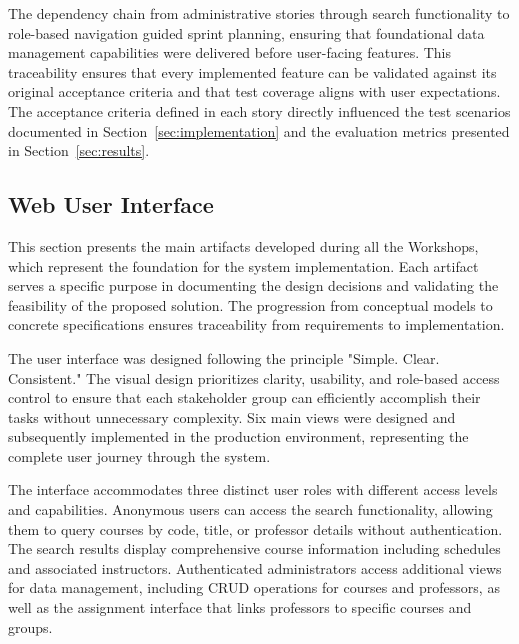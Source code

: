 \documentclass[12pt,a4paper]{article}
\begin{document}
The dependency chain from administrative stories through search functionality to role-based navigation guided sprint planning, ensuring that foundational data management capabilities were delivered before user-facing features. This traceability ensures that every implemented feature can be validated against its original acceptance criteria and that test coverage aligns with user expectations. The acceptance criteria defined in each story directly influenced the test scenarios documented in Section~\ref{sec:implementation} and the evaluation metrics presented in Section~\ref{sec:results}.

\subsection{Web User Interface}
This section presents the main artifacts developed during all the Workshops, which represent the foundation for the system implementation. Each artifact serves a specific purpose in documenting the design decisions and validating the feasibility of the proposed solution. The progression from conceptual models to concrete specifications ensures traceability from requirements to implementation.




The user interface was designed following the principle "Simple. Clear. Consistent." The visual design prioritizes clarity, usability, and role-based access control to ensure that each stakeholder group can efficiently accomplish their tasks without unnecessary complexity. Six main views were designed and subsequently implemented in the production environment, representing the complete user journey through the system.\newline

The interface accommodates three distinct user roles with different access levels and capabilities. Anonymous users can access the search functionality, allowing them to query courses by code, title, or professor details without authentication. The search results display comprehensive course information including schedules and associated instructors. Authenticated administrators access additional views for data management, including CRUD operations for courses and professors, as well as the assignment interface that links professors to specific courses and groups.\newline
\end{document}
